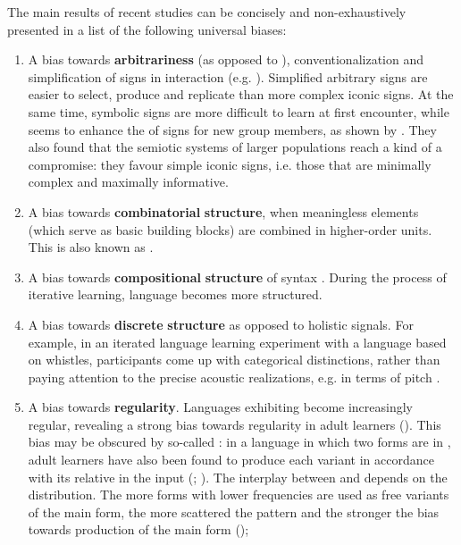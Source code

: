 \documentclass[output=paper]{langsci/langscibook}
\begin{document}
The main results of recent studies can be concisely and non-exhaustively presented in a list of the following universal biases: 

\begin{enumerate}
\item 
A bias towards \textbf{arbitrariness} (as opposed to ), conventionalization and simplification of signs in interaction (e.g. \citealt{CaldwellSmith2012}). Simplified arbitrary signs are easier to select, produce and replicate than more complex iconic signs. At the same time, symbolic signs are more difficult to learn at first encounter, while  seems to enhance the  of signs for new group members, as shown by \citet{FayEllison2013}. They also found that the semiotic systems of larger populations reach a kind of a compromise: they favour simple iconic signs, i.e. those that are minimally complex and maximally informative.
\item 
A bias towards \textbf{combinatorial} \textbf{structure}, when meaningless elements (which serve as basic building blocks) are combined in higher-order units. This is also known as  \citep{Verhoef2012}.
\item 
A bias towards \textbf{compositional} \textbf{structure} of syntax \citep{KirbyEtAl2008}. During the process of iterative learning, language becomes more structured.
\item 
A bias towards \textbf{discrete} \textbf{structure} as opposed to holistic signals. For example, in an iterated language learning experiment with a language based on whistles, participants come up with categorical distinctions, rather than paying attention to the precise acoustic realizations, e.g. in terms of pitch \citep{Verhoef2012}.
\item 
A bias towards \textbf{regularity}. Languages exhibiting  become increasingly regular, revealing a strong bias towards regularity in adult learners (\citealt{SmithWonnacott2010}). This bias may be obscured by so-called : in a language in which two forms are in , adult learners have also been found to produce each variant in accordance with its relative  in the input (\citealt{HudsonKamNewport2009}; \citealt{WonnacottNewport2005}). The interplay between  and  depends on the  distribution. The more forms with lower frequencies are used as free variants of the main form, the more scattered the pattern and the stronger the bias towards production of the main form (\citealt{HudsonKamNewport2009});

\end{enumerate}
\end{document}
